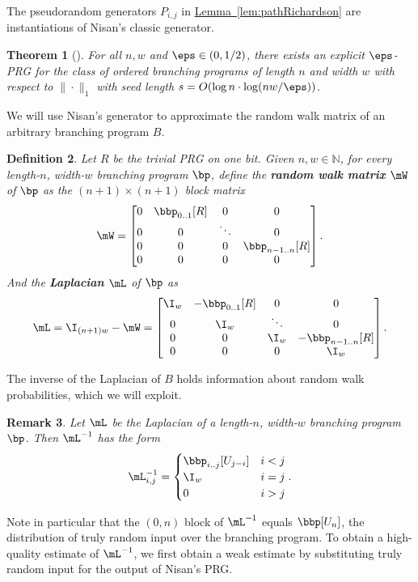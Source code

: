 \documentclass[11pt]{article}
\newcommand{\expref}[2]{\texorpdfstring{\hyperref[#2]{#1~\ref{#2}}}{#1~\ref{#2}}}
\newtheorem{theorem}{Theorem}[section]
\newtheorem{definition}[theorem]{Definition}
\newtheorem{remark}[theorem]{Remark}
\newcommand{\N}{{\mathbb N}}
\begin{document}
The pseudorandom generators $P_{i,j}$ in \expref{Lemma}{lem:pathRichardson} are instantiations
of Nisan's classic generator. %
\begin{theorem}[\cite{Nisan92}]\label{thm:nisan}
    For all $n,w$ and $\eps \in (0,1/2)$, there exists an explicit $\eps$-PRG for the class of ordered branching programs of length $n$ and width $w$ with respect to $\|\cdot\|_{1}$ with seed length $s=O(\log n\cdot \log(nw/\eps))$.
\end{theorem}
We will use Nisan's generator to approximate the random walk matrix of an arbitrary branching program $B$.
\begin{definition}\label{def:pathLap}
Let $R$ be the trivial PRG on one bit. Given $n,w\in \N$, for every length-$n$, width-$w$ branching program $\bp$, define the \textbf{random walk matrix} $\mW$ of $\bp$ as the $(n+1)\times (n+1)$ block matrix
\[\mW=\begin{bmatrix}
0 & \bbp_{0..1}[R] & 0 & 0\\
0 & 0 & \ddots & 0\\
0 & 0 & 0 & \bbp_{n-1..n}[R]\\
0 & 0 & 0 & 0\\
\end{bmatrix}.\]
And the \textbf{Laplacian} $\mL$ of $\bp$ as
\[\mL=\I_{(n+1)w}-\mW=\begin{bmatrix}
\I_w & -\bbp_{0..1}[R] & 0 & 0\\
0 & \I_w & \ddots & 0\\
0 & 0 & \I_w & -\bbp_{n-1..n}[R]\\
0 & 0 & 0 & \I_w\\
\end{bmatrix}.\]
\end{definition}
The inverse of the Laplacian of $B$ holds information about random walk probabilities, which we will exploit.
\begin{remark}\label{rmk:pathLinv}
Let $\mL$ be the Laplacian of a length-$n$, width-$w$ branching program $\bp$. Then $\mL^{-1}$ has the form %
\[\mL^{-1}_{i,j}=\begin{cases}
\bbp_{i..j}[U_{j-i}] & i<j\\
\I_w & i=j\\
0 & i>j
\end{cases}.\] 
\end{remark}
Note in particular that the $(0,n)$ block of $\mL^{-1}$ equals $\bbp[U_n]$, the distribution of truly random input over the branching program. To obtain a high-quality %
estimate of $\mL^{-1}$, we first obtain a weak estimate by substituting truly random input for the output of Nisan's PRG.
\end{document}
